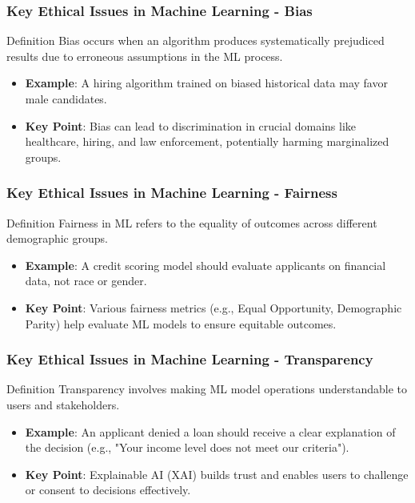 \documentclass[aspectratio=169]{beamer}
\begin{document}
\begin{frame}[fragile]
  \frametitle{Key Ethical Issues in Machine Learning - Bias}
  \begin{block}{Definition}
      Bias occurs when an algorithm produces systematically prejudiced results due to erroneous assumptions in the ML process.
  \end{block}
  \begin{itemize}
      \item \textbf{Example}: A hiring algorithm trained on biased historical data may favor male candidates.
      \item \textbf{Key Point}: Bias can lead to discrimination in crucial domains like healthcare, hiring, and law enforcement, potentially harming marginalized groups.
  \end{itemize}
\end{frame}

\begin{frame}[fragile]
  \frametitle{Key Ethical Issues in Machine Learning - Fairness}
  \begin{block}{Definition}
      Fairness in ML refers to the equality of outcomes across different demographic groups.
  \end{block}
  \begin{itemize}
      \item \textbf{Example}: A credit scoring model should evaluate applicants on financial data, not race or gender.
      \item \textbf{Key Point}: Various fairness metrics (e.g., Equal Opportunity, Demographic Parity) help evaluate ML models to ensure equitable outcomes.
  \end{itemize}
\end{frame}

\begin{frame}[fragile]
  \frametitle{Key Ethical Issues in Machine Learning - Transparency}
  \begin{block}{Definition}
      Transparency involves making ML model operations understandable to users and stakeholders.
  \end{block}
  \begin{itemize}
      \item \textbf{Example}: An applicant denied a loan should receive a clear explanation of the decision (e.g., "Your income level does not meet our criteria").
      \item \textbf{Key Point}: Explainable AI (XAI) builds trust and enables users to challenge or consent to decisions effectively.
  \end{itemize}
\end{frame}
\end{document}
